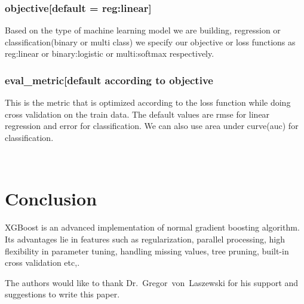 \subsubsection{objective[default = reg:linear]} Based on the type of machine
learning model we are building, regression or classification(binary or multi
class) we specify our objective or loss functions as reg:linear or
binary:logistic or  multi:softmax respectively.

\subsubsection{eval_metric[default according to objective} This is the metric
that is optimized according to the loss function while doing cross validation on
the train data. The default values are rmse for linear regression and  error for
classification. We can also use area under curve(auc) for classification.

~\cite{hid-sp18-401-XGBoost-AnalyticsVidhya} 

\section{Conclusion} 

 XGBoost is an advanced implementation of normal gradient boosting algorithm.
Its advantages lie in features  such as regularization, parallel processing,
high flexibility in parameter tuning, handling missing values, tree pruning,
built-in cross validation etc,.

\begin{acks}

  The authors would like to thank Dr.~Gregor~von~Laszewski for his
  support and suggestions to write this paper.

\end{acks}


 

